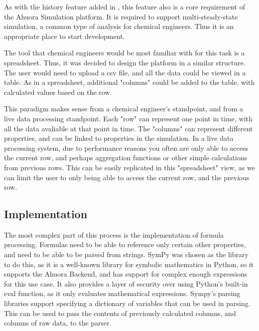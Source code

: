 As with the history feature added in , this feature also is a core requirement of the Ahuora Simulation platform. It is required to support multi-steady-state simulation, a common type of analysis for chemical engineers. Thus it is an appropriate place to start development. 


The tool that chemical engineers would be most familiar with for this task is a spreadsheet. 
Thus, it was decided to design the platform in a similar structure. The user would need to upload a csv file, and all the data could be viewed in a table. 
As in a spreadsheet, additional "columns" could be added to the table, with calculated values based on the row.

This paradigm makes sense from a chemical engineer's standpoint, and from a live data processing standpoint. Each "row" can represent one point in time, with all the data avaliable at that point in time. The "columns" can represent different properties, and can be linked to properties in the simulation. In a live data processing system, due to performance reasons you often are only able to access the current row, and perhaps aggregation functions or other simple calculations from previous rows. This can be easily replicated in this "spreadsheet" view, as we can limit the user to only being able to access the current row, and the previous row.

\subsection{Implementation}

The most complex part of this process is the implementation of formula processing. Formulas need to be able to reference only certain other properties, and need to be able to be parsed from strings. SymPy was chosen as the library to do this, as it is a well-known library for symbolic mathematics in Python, so it supports the Ahuora Backend, and has support for complex enough expressions for this use case. It also provides a layer of security over using Python's built-in eval function, as it only evaluates mathematical expressions.
Sympy's parsing libraries support specifying a dictionary of variables that can be used in parsing. This can be used to pass the contents of previously calculated columns, and columns of raw data, to the parser. 

